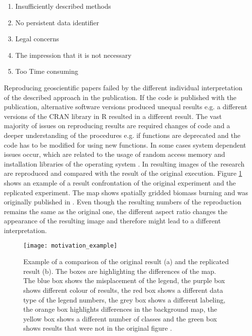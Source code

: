 \documentclass[draft,final]{vutinfth} %
\begin{document}
\begin{enumerate}
	\item Insufficiently described methods 
	\item No persistent data identifier
	\item Legal concerns
	\item The impression that it is not necessary
	\item Too Time consuming
\end{enumerate} 

Reproducing geoscientific papers failed by the different individual interpretation of the described approach in the publication. If the code is published with the publication, alternative software versions produced unequal results e.g. a different versions of the CRAN library in R resulted in a different result. The vast majority of issues on reproducing results are required changes of code and a deeper understanding of the procedures e.g. if functions are deprecated and the code has to be modified for using new functions. In some cases system dependent issues occur, which are related to the usage of random access memory and installation libraries of the operating system \cite{Thestateofreproducibility}. In \cite{Thestateofreproducibility} resulting images of the research are reproduced and compared with the result of the original execution. Figure \ref{fig:motivation} shows an example of a result confrontation of the original experiment and the replicated experiment. The map shows spatially gridded biomass burning and was originally published  in \cite{bg-13-3225-2016}. Even though the resulting numbers of the reproduction remains the same as the original one, the different aspect ratio changes the appearance of the resulting image and therefore might lead to a different interpretation.

\begin{figure}[h]
	\centering
	\texttt{[image: motivation\_example]}
	\caption{Example of a comparison of the original result (a) and the replicated result (b). The boxes are highlighting the differences of the map. The blue box shows the misplacement of the legend, the purple box shows different colour of results, the red box shows a different data type of the legend numbers, the grey box shows a different labeling, the orange box highlights differences in the background map, the yellow box shows a different number of classes and the green box shows results that were not in the original figure \cite{Thestateofreproducibility}.}
	\label{fig:motivation} %
\end{figure} 
\end{document}

